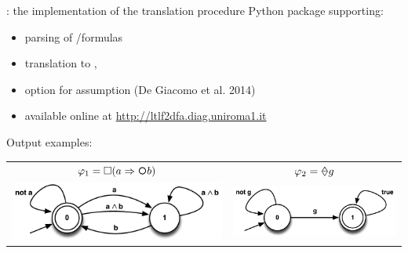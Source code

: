 \documentclass[10pt]{beamer}
\begin{document}
\begin{frame}{\LTLfToDFA: the implementation of the translation procedure}
Python package supporting:
	\begin{itemize}
		\item parsing of \LTLf/\PLTL formulas 
		\item translation to \FOL, \DFA
		\item option for \declare assumption (De Giacomo et al. 2014)
		\item available online at \href{http://ltlf2dfa.diag.uniroma1.it}{http://ltlf2dfa.diag.uniroma1.it}
\end{itemize}
	
	
	Output examples:
\begin{table}
	\centering
\begin{tabular}{c c} 
	$\varphi_1 = \Box(a \Rightarrow \Next b)$ & $\varphi_2 = \Once g$\\
    \includegraphics[width=.5\textwidth]{../images/future-slide} & \includegraphics[width=.5\textwidth]{../images/future-pres}\\
\end{tabular}\\
\end{table}
\end{frame}
\end{document}
